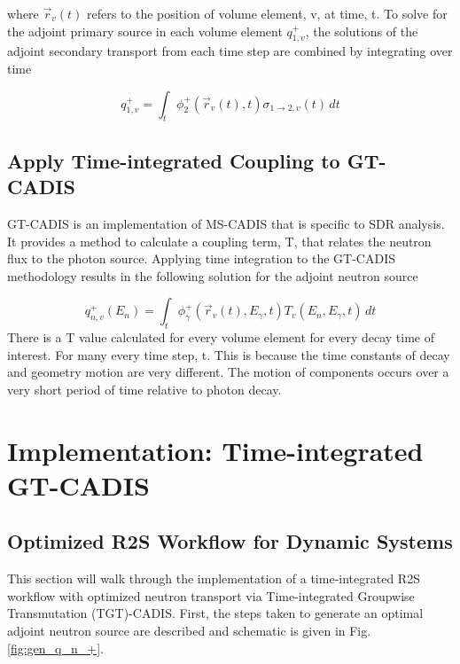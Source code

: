 where $\overrightarrow{r}_{v}(t)$ refers to the position of volume element, v,
at time, t.  To solve for the adjoint primary source in each volume element
$q_{1,v}^{+}$, the solutions of the 
adjoint secondary transport from each time step are combined by
integrating over time

 \begin{equation}\label{eq:adj_src_1_avg}
	 q_{1,v}^{+} =
	 \int_{t}  \phi_{2}^{+}(\overrightarrow{r}_{v}(t), t)
	 \sigma_{1\rightarrow 2,v}(t)\, dt
 \end{equation}

 
\subsection{Apply Time-integrated Coupling to GT-CADIS}

GT-CADIS is an implementation of MS-CADIS that is specific to SDR analysis.  It
provides a method to calculate a coupling term, T, that relates the neutron
flux to the photon source.
Applying time integration to the GT-CADIS methodology results in the following
solution for the adjoint neutron source

 \begin{equation}\label{eq:adj_src_1_avg}
	 q_{n,v}^{+}(E_{n}) =
	 \int_{t}     \phi_{\gamma}^{+}(\overrightarrow{r}_{v}(t), E_{\gamma},t)
	 T_{v}(E_n, E_{\gamma}, t)\, dt
 \end{equation}
 There is a T value calculated for every volume element for every decay time of
 interest.  For many 
 every time step, t.  This is because the time constants of decay and geometry
 motion are very different.  The motion of components occurs over a very short
 period of time relative to photon decay.  


\section{Implementation: Time-integrated GT-CADIS}\label{sec:implementation}

\subsection{Optimized R2S Workflow for Dynamic Systems}
This section will walk through the implementation of a
time-integrated R2S workflow with optimized neutron transport via
Time-integrated Groupwise Transmutation (TGT)-CADIS. 
First, the steps taken to generate an optimal adjoint neutron source are
described and schematic is given in Fig. \ref{fig:gen_q_n_+}.

